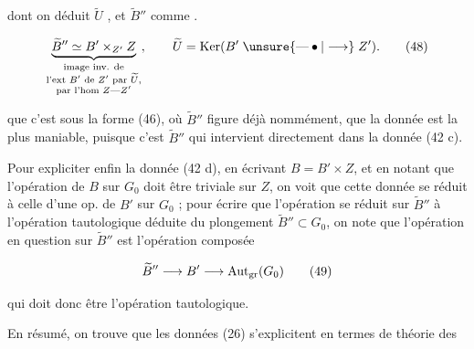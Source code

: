 
dont on déduit $\widetilde U$ , et $\widetilde B''$ comme .

\[
 \underbrace{\widetilde B''\simeq B'\times_{Z'}Z}_{\substack{\text{image inv. de}\\\text{l'ext $B'$ de $Z'$ par $\widetilde U$,}\\\text{par l'hom }Z\mathrel{\text{---}} Z'}},
 \qquad\widetilde U=\operatorname{Ker}(B'\mathrel{\unsure{\text{---}\bullet|\longrightarrow}} Z').\tag*{(48)}
\]

  que c'est sous la forme (46), où $\widetilde B''$ figure déjà nommément, que la donnée est  la plus maniable, puisque c'est  $\widetilde B''$ qui intervient directement dans la donnée (42 c).

 Pour expliciter enfin la donnée (42 d), en écrivant $B=B'\times Z$, et en notant que l'opération de $B$ sur $G_0$ doit être triviale sur $Z$, on voit que cette donnée se réduit à celle d'une op. de $B'$ sur $G_0$ ;  pour écrire que  l'opération  se réduit sur $\widetilde B''$ à l'opération tautologique déduite du plongement $\widetilde B''\subset G_0$, on note que l'opération en question sur $\widetilde B''$ est l'opération composée

\[ \widetilde B''\longrightarrow B'\longrightarrow\operatorname{Aut}_{\rm gr}(G_0) \tag*{(49)} \]

qui doit donc être l'opération tautologique.

En résumé, on trouve que les données (26) s'explicitent en termes de théorie des

